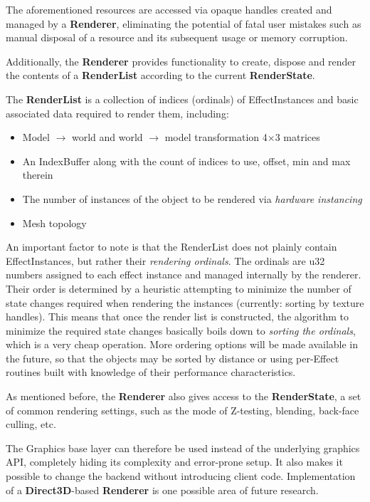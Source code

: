 The aforementioned resources are accessed via opaque handles created and managed by a \textbf{Renderer}, eliminating the potential of fatal user mistakes such as manual disposal of a resource and its subsequent usage or memory corruption.

Additionally, the \textbf{Renderer} provides functionality to create, dispose and render the contents of a \textbf{RenderList} according to the current \textbf{RenderState}.

The \textbf{RenderList} is a collection of indices (ordinals) of EffectInstances and basic associated data required to render them, including:
	
\begin{itemize}
\item Model $\rightarrow$ world and world $\rightarrow$ model transformation 4×3 matrices
\item An IndexBuffer along with the count of indices to use, offset, min and max therein
\item The number of instances of the object to be rendered via \emph{hardware instancing}
\item Mesh topology
\end{itemize}

An important factor to note is that the RenderList does not plainly contain EffectInstances, but rather their \emph{rendering ordinals}. The ordinals are u32 numbers assigned to each effect instance and managed internally by the renderer. Their order is determined by a heuristic attempting to minimize the number of state changes required when rendering the instances (currently: sorting by texture handles). This means that once the render list is constructed, the algorithm to minimize the required state changes basically boils down to \emph{sorting the ordinals}, which is a very cheap operation. More ordering options will be made available in the future, so that the objects may be sorted by distance or using per-Effect routines built with knowledge of their performance characteristics.

As mentioned before, the \textbf{Renderer} also gives access to the \textbf{RenderState}, a set of common rendering settings, such as the mode of Z-testing, blending, back-face culling, etc.

The Graphics base layer can therefore be used instead of the underlying graphics API, completely hiding its complexity and error-prone setup. It also makes it possible to change the backend without introducing client code. Implementation of a \textbf{Direct3D}-based \textbf{Renderer} is one possible area of future research.
	
